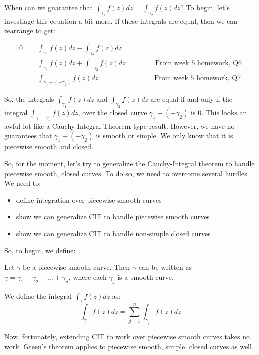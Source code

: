 When can we guarantee that $\int_{\gamma_1}f(z)dz = \int_{\gamma_2}f(z)dz$? To begin, let's investiage this equation a bit more. If these integrals are equal, then we can rearrange to get:

\begin{align*}0 &= \int_{\gamma_1} f(z)dz - \int_{\gamma_2}f(z)dz\\
&= \int_{\gamma_1} f(z)dz + \int_{-\gamma_2} f(z)dz \hspace{50pt} \text{From week 5 homework, Q6}\\
&= \int_{\gamma_1 + (-\gamma_2)}f(z)dz \hspace{95pt}\text{From week 5 homework, Q7}
\end{align*}

So, the integrals $\int_{\gamma_1}f(z)dz$ and $\int_{\gamma_2}f(z)dz$ are equal if and only if the integral $\int_{\gamma_1 - \gamma_2}f(z)dz$, over the closed curve $\gamma_1 + (-\gamma_2)$ is $0$. This looks an awful lot like a Cauchy Integral Theorem type result. However, we have no guarantees that $\gamma_1 + (-\gamma_2)$ is smooth or simple. We only know that it is piecewise smooth and closed.

So, for the moment, let's try to generalize the Cauchy-Integral theorem to handle piecewise smooth, closed curves. To do so, we need to overcome several hurdles. We need to:

\begin{itemize}
\item define integration over piecewise smooth curves
\item show we can generalize CIT to handle piecewise smooth curves
\item show we can generalize CIT to handle non-simple closed curves
\end{itemize}

So, to begin, we define:

\begin{defbo}{}{}Let $\gamma$ be a piecewise smooth curve. Then $\gamma$ can be written as $\gamma = \gamma_1 + \gamma_2 + \dots + \gamma_n$, where each $\gamma_j$ is a smooth curve.

We define the integral $\int_{\gamma}f(z)dz$ as:
$$\int_{\gamma}f(z)dz = \sum_{j = 1}^n \int_{\gamma_j}f(z)dz$$
\end{defbo}

Now, fortunately, extending CIT to work over piecewise smooth curves takes no work. Green's theorem applies to piecewise smooth, simple, closed curves as well.

